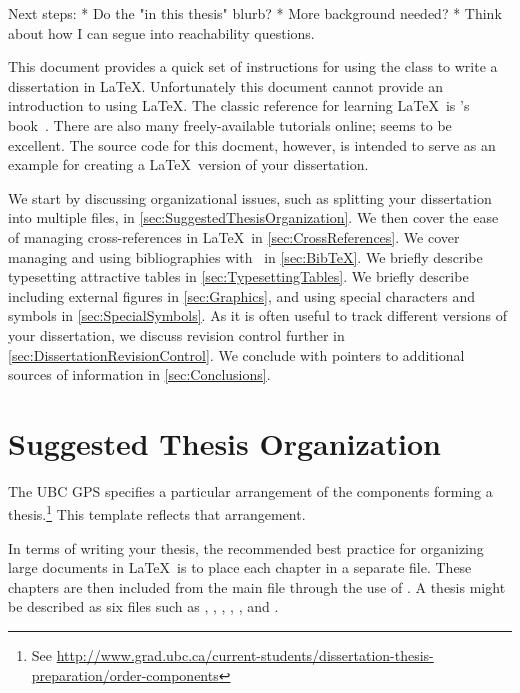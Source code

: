 
Next steps:
  * Do the "in this thesis" blurb?
  * More background needed?
  * Think about how I can segue into reachability questions.

This document provides a quick set of instructions for using the
 class to write a dissertation in \LaTeX. 
Unfortunately this document cannot provide an introduction to using
\LaTeX.  The classic reference for learning \LaTeX\ is
\citeauthor{lamport-1994-ladps}'s
book~\cite{lamport-1994-ladps}.  There are also many freely-available
tutorials online;
seems to be excellent.
The source code for this docment, however, is intended to serve as
an example for creating a \LaTeX\ version of your dissertation.

We start by discussing organizational issues, such as splitting
your dissertation into multiple files, in
\autoref{sec:SuggestedThesisOrganization}.
We then cover the ease of managing cross-references in \LaTeX\ in
\autoref{sec:CrossReferences}.
We cover managing and using bibliographies with \BibTeX\ in
\autoref{sec:BibTeX}. 
We briefly describe typesetting attractive tables in
\autoref{sec:TypesettingTables}.
We briefly describe including external figures in
\autoref{sec:Graphics}, and using special characters and symbols
in \autoref{sec:SpecialSymbols}.
As it is often useful to track different versions of your dissertation,
we discuss revision control further in
\autoref{sec:DissertationRevisionControl}. 
We conclude with pointers to additional sources of information in
\autoref{sec:Conclusions}.

\section{Suggested Thesis Organization}
\label{sec:SuggestedThesisOrganization}

The \acs{UBC} \acf{GPS} specifies a particular arrangement of the
components forming a thesis.\footnote{See
    \url{http://www.grad.ubc.ca/current-students/dissertation-thesis-preparation/order-components}}
This template reflects that arrangement.

In terms of writing your thesis, the recommended best practice for
organizing large documents in \LaTeX\ is to place each chapter in
a separate file.  These chapters are then included from the main
file through the use of \verb++.  A thesis might
be described as six files such as ,
, , ,
, and .

